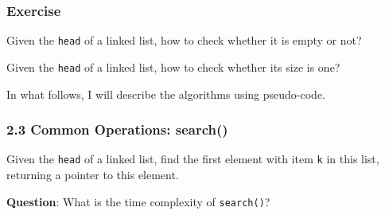 \documentclass[aspectratio=169, 14pt]{beamer}
\begin{document}
\begin{frame}
	\frametitle{Exercise}
	{\large {}} Given the \alert{\texttt{head}} of a linked list, how to check whether it is empty or not?

	\pause


	{\large {}} Given the \alert{\texttt{head}} of a linked list, how to check whether its size is one?
\end{frame}

{
\begin{frame}[standout]
	In what follows, I will describe the algorithms using pseudo-code.
\end{frame}
}

\begin{frame}
	\frametitle{2.3 Common Operations: search()}
	Given the \alert{\texttt{head}} of a linked list, find the first element with item \alert{\texttt{k}} in this list, returning a pointer to this element.


	{\large {}} \textbf{Question}: What is the time complexity of \texttt{search()}?
\end{frame}
\end{document}
